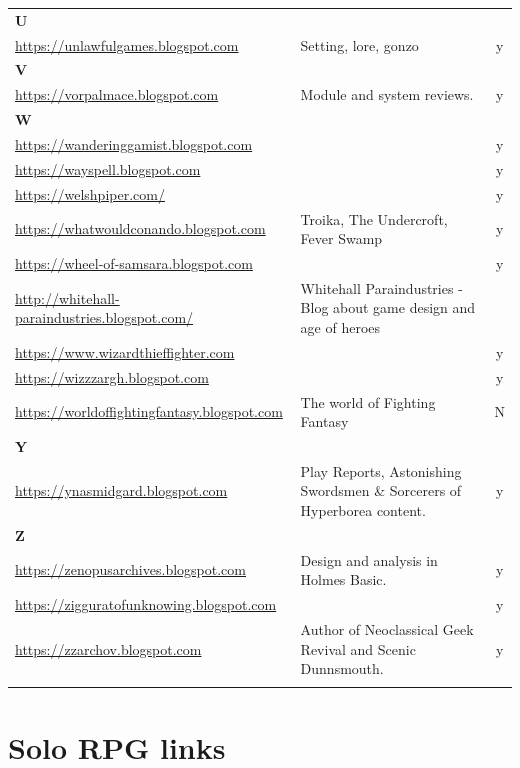 \documentclass[a4paper, 11pt, twoside]{article}
\begin{document}
\begin{longtable}{p{6cm}p{8cm}c}
\textbf{U} &  & \\
\url{https://unlawfulgames.blogspot.com} & Setting, lore, gonzo & y\\
\textbf{V} &  & \\
\url{https://vorpalmace.blogspot.com} & Module and system reviews. & y\\
\textbf{W} &  & \\
\url{https://wanderinggamist.blogspot.com} &  & y\\
\url{https://wayspell.blogspot.com} &  & y\\
\url{https://welshpiper.com/} &  & y\\
\url{https://whatwouldconando.blogspot.com} & Troika, The Undercroft, Fever Swamp & y\\
\url{https://wheel-of-samsara.blogspot.com} &  & y\\
\url{http://whitehall-paraindustries.blogspot.com/} & Whitehall Paraindustries - Blog about game design and age of heroes & \\
\url{https://www.wizardthieffighter.com} &  & y\\
\url{https://wizzzargh.blogspot.com} &  & y\\
\url{https://worldoffightingfantasy.blogspot.com} & The world of Fighting Fantasy & N\\
\textbf{Y} &  & \\
\url{https://ynasmidgard.blogspot.com} & Play Reports, Astonishing Swordsmen \& Sorcerers of Hyperborea content. & y\\
\textbf{Z} &  & \\
\url{https://zenopusarchives.blogspot.com} & Design and analysis in Holmes Basic. & y\\
\url{https://zigguratofunknowing.blogspot.com} &  & y\\
\url{https://zzarchov.blogspot.com} & Author of Neoclassical Geek Revival and Scenic Dunnsmouth. & y\\
 &  & \\
\end{longtable}

\section{Solo RPG links}
\label{sec:org196c1fc}
\end{document}
